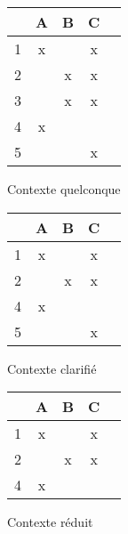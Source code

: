 \begin{figure}[H]
	\begin{minipage}[t]{0.3\textwidth}
	\begin{center}
		\begin{tabular}{ l | c c c c }
			 & A & B & C \\
			\hline
			1 & x &  & x \\
			2 &  & x & x \\
			3 &  & x & x \\
			4 & x &  &  \\
			5 &  &  & x \\
		\end{tabular}
		\caption{Contexte quelconque}
		\label{contexte_quelconque}
	\end{center}
	\end{minipage}
	\begin{minipage}[t]{0.3\textwidth}
	\begin{center}
		\begin{tabular}{ l | c c c c }
			 & A & B & C \\
			\hline
			1 & x &  & x \\
			2 &  & x & x \\
			4 & x &  &  \\
			5 &  &  & x \\
		\end{tabular}
		\caption{Contexte clarifié}
		\label{contexte_clarifié}
	\end{center}
	\end{minipage}
	\begin{minipage}[t]{0.3\textwidth}
	\begin{center}
		\begin{tabular}{ l | c c c c }
			 & A & B & C \\
			\hline
			1 & x &  & x \\
			2 &  & x & x \\
			4 & x &  &  \\
		\end{tabular}
		\caption{Contexte réduit}
		\label{contexte_réduit}
	\end{center}
	\end{minipage}
\end{figure}